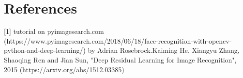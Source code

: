 \section{References}
[1] tutorial on pyimagesearch.com (https://www.pyimagesearch.com/2018/06/18/face-recognition-with-opencv-python-and-deep-learning/) by Adrian Rosebrock.\newline\newline
[2] Kaiming He, Xiangyu Zhang, Shaoqing Ren and Jian Sun, "Deep Residual Learning for Image Recognition", 2015 (https://arxiv.org/abs/1512.03385)
